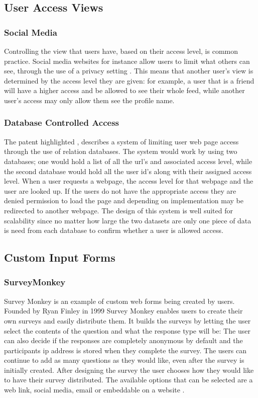 \documentclass[12pt]{article}  %
\begin{document}
\subsection{User Access Views}

\subsubsection{Social Media}
Controlling the view that users have, based on their access level, is common practice. Social media websites for instance allow users to limit what others can see, through the use of a privacy setting \cite{tufekci_can_2008}. This means that another user's view is determined by the access level they are given: for example, a user that is a friend will have a higher access and be allowed to see their whole feed, while another user's access may only allow them see the profile name.

\subsubsection{Database Controlled Access}
The patent highlighted \cite{noauthor_system_1997}, describes a system of limiting user web page access through the use of relation databases. The system would work by using two databases; one would hold a list of all the url's and associated access level, while the second database would hold all the user id's along with their assigned access level. When a user requests a webpage, the access level for that webpage and the user are looked up. If the users do not have the appropriate access they are denied permission to load the page and depending on implementation may be redirected to another webpage.
The design of this system is well suited for scalability since no matter how large the two datasets are only one piece of data is need from each database to confirm whether a user is allowed access.


\subsection{Custom Input Forms}

\subsubsection{SurveyMonkey}
Survey Monkey \cite{finley_surveymonkey_1999} is an example of custom web forms being created by users. Founded by Ryan Finley in 1999 Survey Monkey enables users to create their own surveys and easily distribute them. It builds the surveys by letting the user select the contents of the question and what the response type will be: The user can also decide if the responses are completely anonymous by default and the participants ip address is stored when they complete the survey. The users can continue to add as many questions as they would like, even after the survey is initially created. After designing the survey the user chooses how they would like to have their survey distributed. The available options that can be selected are a web link, social media, email or embeddable on a website \cite{waclawski_how_2012}.
\end{document}
